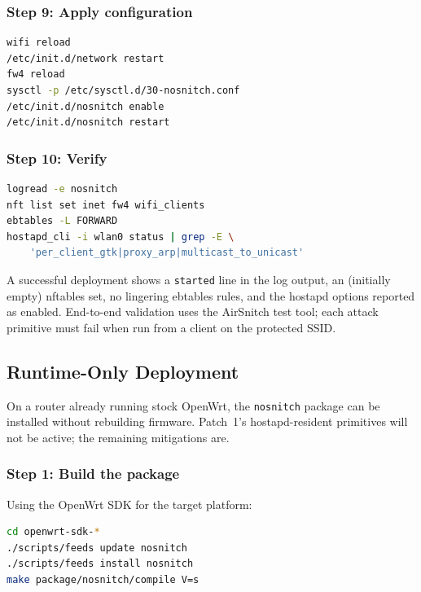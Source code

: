 \subsubsection{Step 9: Apply configuration}

\begin{lstlisting}[language=bash]
wifi reload
/etc/init.d/network restart
fw4 reload
sysctl -p /etc/sysctl.d/30-nosnitch.conf
/etc/init.d/nosnitch enable
/etc/init.d/nosnitch restart
\end{lstlisting}

\subsubsection{Step 10: Verify}

\begin{lstlisting}[language=bash]
logread -e nosnitch
nft list set inet fw4 wifi_clients
ebtables -L FORWARD
hostapd_cli -i wlan0 status | grep -E \
    'per_client_gtk|proxy_arp|multicast_to_unicast'
\end{lstlisting}

\noindent A successful deployment shows a \texttt{started} line in the
log output, an (initially empty) nftables set, no lingering ebtables
rules, and the hostapd options reported as enabled. End-to-end
validation uses the AirSnitch test tool; each attack primitive must
fail when run from a client on the protected SSID.

\subsection{Runtime-Only Deployment}
\label{sec:deploy-runtime}

On a router already running stock OpenWrt, the \texttt{nosnitch}
package can be installed without rebuilding firmware. Patch~1's
hostapd-resident primitives will not be active; the remaining
mitigations are.

\subsubsection{Step 1: Build the package}

Using the OpenWrt SDK for the target platform:

\begin{lstlisting}[language=bash]
cd openwrt-sdk-*
./scripts/feeds update nosnitch
./scripts/feeds install nosnitch
make package/nosnitch/compile V=s
\end{lstlisting}

